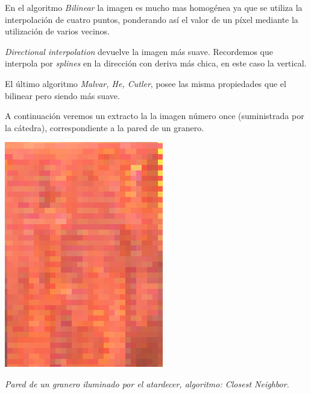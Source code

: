 En el algoritmo \textit{Bilinear} la imagen es mucho mas homogénea ya que se utiliza la interpolación de cuatro puntos, ponderando así el valor de un píxel mediante la utilización de varios vecinos.

\textit{Directional interpolation} devuelve la imagen más suave. Recordemos que interpola por \textit{splines} en la dirección con deriva más chica, en este caso la vertical. 

El último algoritmo \textit{Malvar, He, Cutler}, posee las misma propiedades que el bilinear pero siendo más suave.

A continuación veremos un extracto la la imagen número once (suministrada por la cátedra), correspondiente a la pared de un granero.

	\begin{center}
		\includegraphics[scale=.5]{../enunciado/images_files/cualitativo/farm_closest.png}
		\vspace{2pt}
		\par
		\footnotesize\textit{Pared de un granero iluminado por el atardecer, algoritmo: Closest Neighbor.}
	\end{center}


